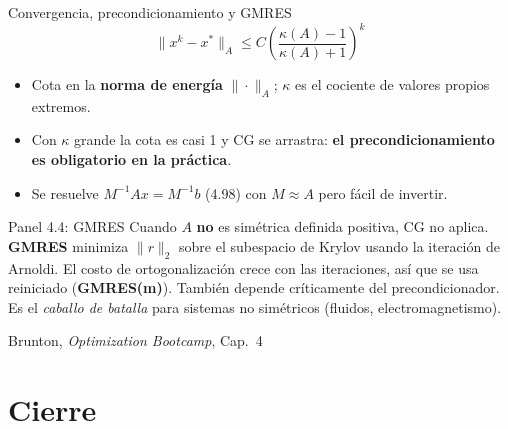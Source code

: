 \documentclass[10pt,aspectratio=169]{beamer}
\newcommand{\fuente}{\vfill{\scriptsize\color{gray}Brunton, \emph{Optimization Bootcamp}, Cap.~4}}
\begin{document}
\begin{frame}{Convergencia, precondicionamiento y GMRES}
  \small
  \[
    \|x^k - x^*\|_A \le C\left(\frac{\kappa(A)-1}{\kappa(A)+1}\right)^{k}
    \tag{4.97}
  \]
  \begin{itemize}
    \item Cota en la \textbf{norma de energía} $\|\cdot\|_A$; $\kappa$ es el
      cociente de valores propios extremos.
    \item Con $\kappa$ grande la cota es casi 1 y CG se arrastra:
      \textbf{el precondicionamiento es obligatorio en la práctica}.
    \item Se resuelve $M^{-1}Ax = M^{-1}b$ (4.98) con $M \approx A$ pero fácil
      de invertir.
  \end{itemize}

  \begin{block}{Panel 4.4: GMRES}
    \scriptsize
    Cuando $A$ \textbf{no} es simétrica definida positiva, CG no aplica.
    \textbf{GMRES} minimiza $\|r\|_2$ sobre el subespacio de Krylov usando la
    iteración de Arnoldi. El costo de ortogonalización crece con las
    iteraciones, así que se usa reiniciado (\textbf{GMRES(m)}). También depende
    críticamente del precondicionador. Es el \emph{caballo de batalla} para
    sistemas no simétricos (fluidos, electromagnetismo).
  \end{block}
  \fuente
\end{frame}

\section{Cierre}
\end{document}
